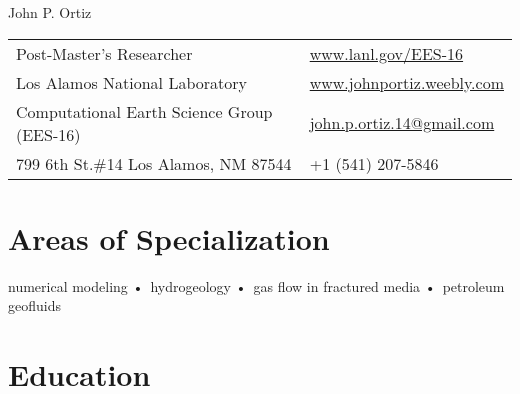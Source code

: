 \documentclass[11pt, letterpaper]{article}
\def\doubleline{

	\vspace{-1.4em}
	\hspace{\fill}\linethickness{0.7pt}\line(1,0){5.5in}\hspace{\fill}
	
	\vspace{-1.0em}
	\hspace{\fill}\linethickness{0.7pt}\line(1,0){5.5in}\hspace{\fill}
	
}
\begin{document}
{\LARGE John P. Ortiz} %




\begin{center}
	\begin{tabular}{l l}
		Post-Master's Researcher    & \hspace{.5in}\href{www.lanl.gov/EES-16}{www.lanl.gov/EES-16} \\
		Los Alamos National Laboratory   & \hspace{.5in}\href{http://johnportiz.weebly.com/}{www.johnportiz.weebly.com}   \\
		Computational Earth Science Group (EES-16)       & \hspace{.5in}\Letter {     } \href{mailto:john.p.ortiz.14@gmail.com}{john.p.ortiz.14@gmail.com}    \\ 
		799 6th St.\#14  Los Alamos, NM 87544 & \hspace{.5in}\Mobilefone { } +1 (541) 207-5846  \\
		
	\end{tabular}
\end{center}


\section*{Areas of Specialization}
	numerical modeling •\ hydrogeology •\ gas flow in fractured media •\ petroleum geofluids
	

\section*{Education}
\noindent
\end{document}
